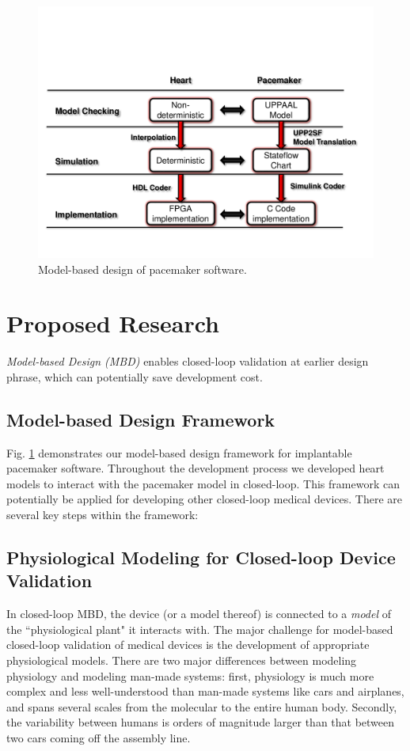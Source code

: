 \documentclass[a4paper]{article}
\begin{document}
\begin{figure}[t]
	\centering
	\includegraphics[scale=0.35]{figs/model_based_b.pdf}
	\caption{\small Model-based design of pacemaker software.}
	\label{fig:MBD}
\end{figure}
\section{Proposed Research}
\emph{Model-based Design (MBD)} enables closed-loop validation at earlier design phrase, which can potentially save development cost.
\subsection{Model-based Design Framework}
Fig. \ref{fig:MBD} demonstrates our model-based design framework for implantable pacemaker software.
Throughout the development process we developed heart models to interact with the pacemaker model in closed-loop. 
This framework can potentially be applied for developing other closed-loop medical devices.
There are several key steps within the framework:
\subsection{Physiological Modeling for Closed-loop Device Validation}
In closed-loop MBD, the device (or a model thereof) is connected to a \emph{model} of the ``physiological plant" it interacts with.
The major challenge for model-based closed-loop validation of medical devices is the development of appropriate physiological models.
There are two major differences between modeling physiology and modeling man-made systems:
first, physiology is much more complex and less well-understood than man-made systems like cars and airplanes, and spans several scales from the molecular to the entire human body.
Secondly, the variability between humans is orders of magnitude larger than that between two cars coming off the assembly line.
\end{document}
